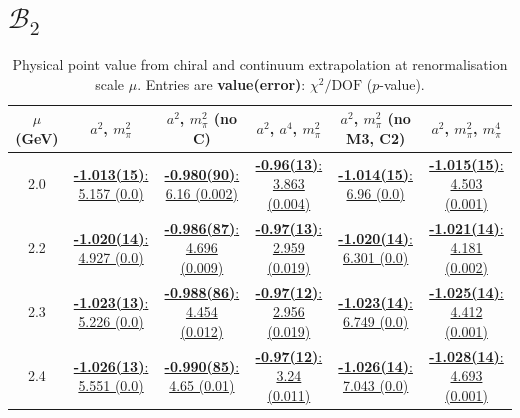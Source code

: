 \documentclass[12pt]{extarticle}
\begin{document}
\section{$\mathcal{B}_2$}
\begin{table}[h!]
\begin{center}
\begin{tabular}{|c|c|c|c|c|c|}
\hline
$\mu$ (GeV) & $a^2$, $m_\pi^2$& $a^2$, $m_\pi^2$ (no C)& $a^2$, $a^4$, $m_\pi^2$& $a^2$, $m_\pi^2$ (no M3, C2)& $a^2$, $m_\pi^2$, $m_\pi^4$\\
\hline
2.0& \hyperlink{VVmAA/NPR/a2m2_20.pdf.1}{\textbf{-1.013(15)}: 5.157 (0.0)} & \hyperlink{VVmAA/NPR/a2m2noC_20.pdf.1}{\textbf{-0.980(90)}: 6.16 (0.002)} & \hyperlink{VVmAA/NPR/a2a4m2_20.pdf.1}{\textbf{-0.96(13)}: 3.863 (0.004)} & \hyperlink{VVmAA/NPR/a2m2mcut_20.pdf.1}{\textbf{-1.014(15)}: 6.96 (0.0)} & \hyperlink{VVmAA/NPR/a2m2m4_20.pdf.1}{\textbf{-1.015(15)}: 4.503 (0.001)}\\
2.2& \hyperlink{VVmAA/NPR/a2m2_22.pdf.1}{\textbf{-1.020(14)}: 4.927 (0.0)} & \hyperlink{VVmAA/NPR/a2m2noC_22.pdf.1}{\textbf{-0.986(87)}: 4.696 (0.009)} & \hyperlink{VVmAA/NPR/a2a4m2_22.pdf.1}{\textbf{-0.97(13)}: 2.959 (0.019)} & \hyperlink{VVmAA/NPR/a2m2mcut_22.pdf.1}{\textbf{-1.020(14)}: 6.301 (0.0)} & \hyperlink{VVmAA/NPR/a2m2m4_22.pdf.1}{\textbf{-1.021(14)}: 4.181 (0.002)}\\
2.3& \hyperlink{VVmAA/NPR/a2m2_23.pdf.1}{\textbf{-1.023(13)}: 5.226 (0.0)} & \hyperlink{VVmAA/NPR/a2m2noC_23.pdf.1}{\textbf{-0.988(86)}: 4.454 (0.012)} & \hyperlink{VVmAA/NPR/a2a4m2_23.pdf.1}{\textbf{-0.97(12)}: 2.956 (0.019)} & \hyperlink{VVmAA/NPR/a2m2mcut_23.pdf.1}{\textbf{-1.023(14)}: 6.749 (0.0)} & \hyperlink{VVmAA/NPR/a2m2m4_23.pdf.1}{\textbf{-1.025(14)}: 4.412 (0.001)}\\
2.4& \hyperlink{VVmAA/NPR/a2m2_24.pdf.1}{\textbf{-1.026(13)}: 5.551 (0.0)} & \hyperlink{VVmAA/NPR/a2m2noC_24.pdf.1}{\textbf{-0.990(85)}: 4.65 (0.01)} & \hyperlink{VVmAA/NPR/a2a4m2_24.pdf.1}{\textbf{-0.97(12)}: 3.24 (0.011)} & \hyperlink{VVmAA/NPR/a2m2mcut_24.pdf.1}{\textbf{-1.026(14)}: 7.043 (0.0)} & \hyperlink{VVmAA/NPR/a2m2m4_24.pdf.1}{\textbf{-1.028(14)}: 4.693 (0.001)}\\
\hline
\end{tabular}
\caption{Physical point value from chiral and continuum extrapolation at renormalisation scale $\mu$. Entries are \textbf{value(error)}: $\chi^2/\text{DOF}$ ($p$-value).}
\end{center}
\end{table}
\end{document}
